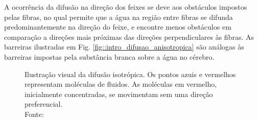 \documentclass[
    12pt,                %
    oneside,            %
    a4paper,            %
    english,            %
    french,                %
    spanish,            %
    brazil                %
    ]{abntex2}
\begin{document}
A ocorrência da difusão na direção dos feixes se deve aos obstáculos impostos pelas fibras, no qual permite que a água na região entre fibras se difunda predominantemente na direção do feixe, e encontre menos obstáculos em comparação a direções mais próximas das direções perpendiculares às fibras. As barreiras ilustradas em Fig. \ref{fig::intro_difusao_anisotropica} são análogas 
às barreiras impostas pela substância branca sobre a água no cérebro.


\begin{figure}[ht]
\centering
\captionsetup[subfloat]{farskip=0pt,nearskip=0pt}
    \caption{Ilustração visual da difusão isotrópica. Os pontos azuis e vermelhos representam moléculas de fluidos. As moléculas em vermelho, inicialmente concentradas, se movimentam sem uma direção preferencial. \\ Fonte: \cite{voltoline2016}}
    \label{fig::intro_difusao_isotropica}
\end{figure}
\end{document}
